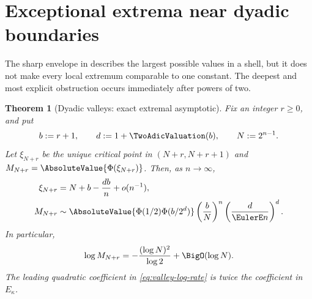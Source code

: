 \documentclass[11pt,oneside]{article}
\newtheorem{theorem}{Theorem}[section]
\theoremstyle{definition}
\theoremstyle{remark}
\newcommand{\Phiup}{\Phi}
\begin{document}
\section{Exceptional extrema near dyadic boundaries}
\label{sec:exceptional-extrema}

The sharp envelope in  describes the largest possible values in
a shell, but it does not make every local extremum comparable to one constant.  The deepest
and most explicit obstruction occurs immediately after powers of two.

\begin{theorem}[Dyadic valleys: exact extremal asymptotic]
\label{thm:dyadic-valleys}
Fix an integer $r\ge0$, and put
\[
 b:=r+1,
 \qquad
 d:=1+\TwoAdicValuation(b),
 \qquad
 N:=2^{n-1}.
\]
Let $\xi_{N+r}$ be the unique critical point in $(N+r,N+r+1)$ and
$M_{N+r}=\AbsoluteValue{\Phiup(\xi_{N+r})}$.  Then, as $n\to\infty$,
\begin{align}
 \xi_{N+r}
 &=N+b-\frac{db}{n}+o(n^{-1}),
 \label{eq:valley-location}\\
 M_{N+r}
 &\sim
 \AbsoluteValue{\Phiup(1/2)\Phiup(b/2^d)}
 \left(\frac bN\right)^n
 \left(\frac d{\EulerE n}\right)^d.
 \label{eq:valley-amplitude}
\end{align}
In particular,
\begin{equation}
 \log M_{N+r}
 =-\frac{(\log N)^2}{\log2}+\BigO(\log N).
 \label{eq:valley-log-rate}
\end{equation}
The leading quadratic coefficient in \eqref{eq:valley-log-rate} is twice the coefficient in
$E_\kappa$.
\end{theorem}
\end{document}
